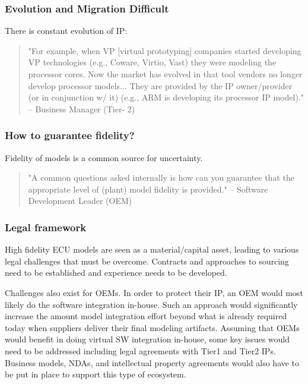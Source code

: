 \subsubsection{Evolution and Migration Difficult}
There is constant evolution of IP:
\begin{quote}
"For example, when VP [virtual prototyping] companies started developing VP technologies (e.g., Coware, Virtio, Vast) they were modeling the processor cores. Now the market has evolved in that tool vendors no longer develop processor models... They are provided by the IP owner/provider (or in conjunction w/ it) (e.g., ARM is developing its processor IP model)." 
-- Business Manager (Tier- 2)
\end{quote}

\subsubsection{How to guarantee fidelity?}
Fidelity of models is a common source for uncertainty.
\begin{quote}
"A common questions asked internally is how can you guarantee that the appropriate level of (plant) model fidelity is provided." 
-- Software Development Leader (OEM)
\end{quote}

\subsubsection{Legal framework}
High fidelity ECU models are seen as a material/capital asset, leading to various legal challenges that must be overcome. Contracts and approaches to sourcing need to be established and experience needs to be developed.

Challenges also exist for OEMs. In order to protect their IP, an OEM would most likely do the software integration in-house. Such an approach would significantly increase the amount model integration effort beyond what is already required today when suppliers deliver their final modeling artifacts.
Assuming that OEMs would benefit in doing virtual SW integration in-house, some key issues would need to be addressed including legal agreements with Tier1 and Tier2 IPs. Business models, NDAs, and intellectual property agreements would also have to be put in place to support this type of ecosystem.

